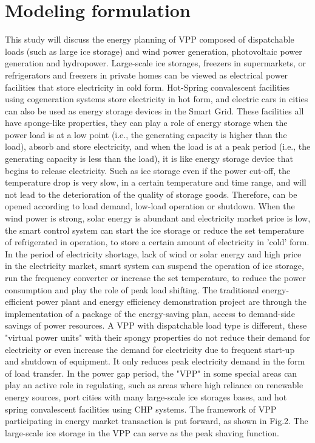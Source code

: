 \documentclass[twocolumn,a4paper]{IEEEtran}
\begin{document}
\section{Modeling formulation}
This study will discuss the energy planning of VPP composed of dispatchable loads (such as large ice storage) and wind power generation, photovoltaic power generation and hydropower. 
Large-scale ice storages, freezers in supermarkets, or refrigerators and freezers in private homes can be viewed as electrical power facilities that store electricity in cold form. 
Hot-Spring convalescent facilities using cogeneration systems store electricity in hot form, and electric cars in cities can also be used as energy storage devices in the Smart Grid. 
These facilities all have sponge-like properties, they can play a role of energy storage when the power load is at a low point (i.e., the generating capacity is higher than the load), absorb and store electricity, and when the load is at a peak period (i.e., the generating capacity is less than the load), it is like energy storage device that begins to release electricity. 
Such as ice storage even if the power cut-off, the temperature drop is very slow, in a certain temperature and time range, and will not lead to the deterioration of the quality of storage goods. 
Therefore, can be opened according to load demand, low-load operation or shutdown. When the wind power is strong, solar energy is abundant and electricity market price is low, the smart control system can start the ice storage or reduce the set temperature of refrigerated in operation, to store a certain amount of electricity in 'cold' form. 
In the period of electricity shortage, lack of wind or solar energy and high price in the electricity market, smart system can suspend the operation of ice storage, run the frequency converter or increase the set temperature, to reduce the power consumption and play the role of peak load shifting. 
The traditional energy-efficient power plant and energy efficiency demonstration project are through the implementation of a package of the energy-saving plan, access to demand-side savings of power resources. 
A VPP with dispatchable load type is different, these "virtual power units" with their spongy properties do not reduce their demand for electricity or even increase the demand for electricity due to frequent start-up and shutdown of equipment. 
It only reduces peak electricity demand in the form of load transfer. 
In the power gap period, the "VPP" in some special areas can play an active role in regulating, such as areas where high reliance on renewable energy sources, port cities with many large-scale ice storages bases, and hot spring convalescent facilities using CHP systems.
The framework of VPP participating in energy market transaction is put forward, as shown in Fig.2. 
The large-scale ice storage in the VPP can serve as the peak shaving function.
\end{document}
